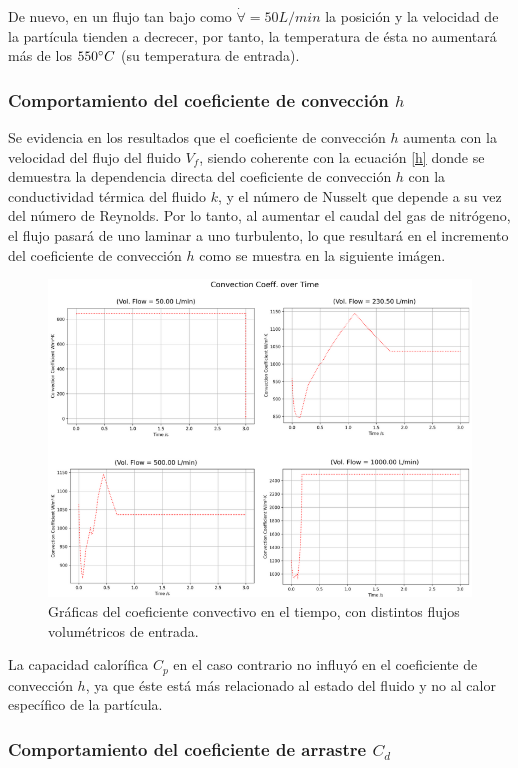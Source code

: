 \documentclass[11pt,stdletter,orderfromtodate,sigleft,twoside]{report}
\begin{document}
De nuevo, en un flujo tan bajo como $\dot{\forall}=50 L/min$ la posición y la velocidad de la partícula tienden a decrecer, por tanto, la temperatura de ésta no aumentará más de los $550 \degree C$ (su temperatura de entrada).

\subsubsection{Comportamiento del coeficiente de convección \texorpdfstring{$h$}{h}}

Se evidencia en los resultados que el coeficiente de convección $h$ aumenta con la velocidad del flujo del fluido $V_f$, siendo coherente con la ecuación \ref{h} donde se demuestra la dependencia directa del coeficiente de convección $h$ con la conductividad térmica del fluido $k$, y el número de Nusselt que depende a su vez del número de Reynolds. Por lo tanto, al aumentar el caudal del gas de nitrógeno, el flujo pasará de uno laminar a uno turbulento, lo que resultará en el incremento del coeficiente de convección $h$ como se muestra en la siguiente imágen.

\begin{figure}[H]
    \centering
    \includegraphics[width=0.7\linewidth]{figures/Convec1.png}
    \caption{Gráficas del coeficiente convectivo en el tiempo, con distintos flujos volumétricos de entrada.}
    \label{fig:enter-label}
\end{figure}

La capacidad calorífica $C_p$ en el caso contrario no influyó en el coeficiente de convección $h$, ya que éste está más relacionado al estado del fluido y no al calor específico de la partícula. 

\subsubsection{Comportamiento del coeficiente de arrastre $C_d$}
\end{document}
